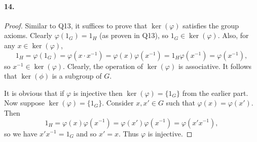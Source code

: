 \documentclass{article}
\begin{document}
\paragraph{14.}
\begin{proof}
  Similar to Q13, it suffices to prove that $\ker(\varphi)$ satisfies the group
  axioms. Clearly $\varphi(1_G) = 1_H$ (as proven in Q13), so $1_G \in
  \ker(\varphi)$. Also, for any $x \in \ker(\varphi)$, \[
    1_H = \varphi(1_G) = \varphi(x \cdot x^{-1}) = \varphi(x)\varphi(x^{-1}) =
    1_H\varphi(x^{-1}) = \varphi(x^{-1}),
  \] so $x^{-1} \in \ker(\varphi)$. Clearly, the operation of $\ker(\varphi)$
  is associative. It follows that $\ker(\phi)$ is a subgroup of $G$.

  It is obvious that if $\varphi$ is injective then $\ker(\varphi) = \{1_G\}$
  from the earlier part. Now suppose $\ker(\varphi) = \{1_G\}$. Consider $x, x'
  \in G$ such that $\varphi(x) = \varphi(x')$. Then \[
    1_H = \varphi(x)\varphi(x^{-1}) = \varphi(x')\varphi(x^{-1}) =
    \varphi(x'x^{-1}),
  \] so we have $x'x^{-1} = 1_G$ and so $x' = x$. Thus $\varphi$ is injective.
\end{proof}
\end{document}
